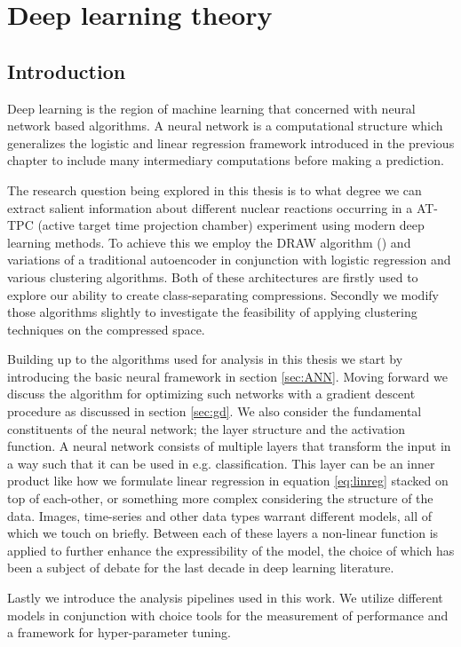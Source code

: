 \chapter{Deep learning theory}\label{ch:ml}
\section{Introduction}

Deep learning is the region of machine learning that concerned with neural network based algorithms. A neural network is a computational structure which generalizes the logistic and linear regression framework introduced in the previous chapter to include many intermediary computations before making a prediction.

The research question being explored in this thesis is to what degree we can extract salient information about different nuclear reactions occurring in a AT-TPC (active target time projection chamber) experiment using modern deep learning methods. To achieve this we employ the DRAW algorithm (\cite{Gregor2015}) and variations of a traditional autoencoder in conjunction with logistic regression and various clustering algorithms. Both of these architectures are firstly used to explore our ability to create class-separating compressions. Secondly we modify those algorithms slightly to investigate the feasibility of applying clustering techniques on the compressed space. 

Building up to the algorithms used for analysis in this thesis we start by introducing the basic neural framework in section \ref{sec:ANN}. Moving forward we discuss the algorithm for optimizing such networks with a gradient descent procedure as discussed in section \ref{sec:gd}. We also consider the fundamental constituents of the neural network; the layer structure and the activation function. A neural network consists of multiple layers that transform the input in a way such that it can be used in e.g. classification. This layer can be an inner product like how we formulate linear regression in equation \ref{eq:linreg} stacked on top of each-other, or something more complex considering the structure of the data. Images, time-series and other data types warrant different models, all of which we touch on briefly. Between each of these layers a non-linear function is applied to further enhance the expressibility of the model, the choice of which has been a subject of debate for the last decade in deep learning literature.

Lastly we introduce the analysis pipelines used in this work. We utilize different models in conjunction with choice tools for the measurement of performance and a framework for hyper-parameter tuning. 